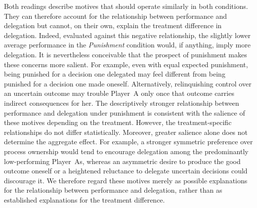 Both readings describe motives that should operate similarly in both conditions. They can therefore account for the relationship between performance and delegation but cannot, on their own, explain the treatment difference in delegation. Indeed, evaluated against this negative relationship, the slightly lower average performance in the \textit{Punishment} condition would, if anything, imply more delegation. It is nevertheless conceivable that the prospect of punishment makes these concerns more salient. For example, even with equal expected punishment, being punished for a decision one delegated may feel different from being punished for a decision one made oneself. Alternatively, relinquishing control over an uncertain outcome may trouble Player~A only once that outcome carries indirect consequences for her. The descriptively stronger relationship between performance and delegation under punishment is consistent with the salience of these motives depending on the treatment. However, the treatment-specific relationships do not differ statistically. Moreover, greater salience alone does not determine the aggregate effect. For example, a stronger symmetric preference over process ownership would tend to encourage delegation among the predominantly low-performing Player~As, whereas an asymmetric desire to produce the good outcome oneself or a heightened reluctance to delegate uncertain decisions could discourage it. We therefore regard these motives merely as possible explanations for the relationship between performance and delegation, rather than as established explanations for the treatment difference.



